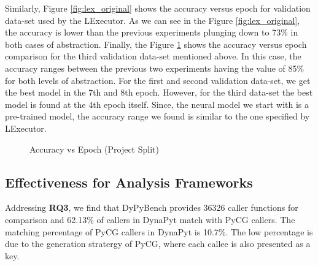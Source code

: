 Similarly, Figure \ref{fig:lex_original} shows the accuracy versus epoch for validation data-set used by the LExecutor.
As we can see in the Figure \ref{fig:lex_original}, the accuracy is lower than the previous experiments plunging down to 73\% in both cases of abstraction.
Finally, the Figure \ref{fig:lex_project} shows the accuracy versus epoch comparison for the third validation data-set mentioned above.
In this case, the accuracy ranges between the previous two experiments having the value of 85\% for both levels of abstraction.
For the first and second validation data-set, we get the best model in the 7th and 8th epoch.
However, for the third data-set the best model is found at the 4th epoch itself.
Since, the neural model we start with is a pre-trained model, the accuracy range we found is similar to the one specified by LExecutor.

\begin{figure}[ht]
    \centering
    \caption[Accuracy vs Epoch (Project Split)]{\label{fig:lex_project}Accuracy vs Epoch (Project Split) }
\end{figure}


\subsection{Effectiveness for Analysis Frameworks}
Addressing \textbf{RQ3}, we find that DyPyBench provides 36326 caller functions for comparison and 62.13\% of callers in DynaPyt match with PyCG callers.
The matching percentage of PyCG callers in DynaPyt is 10.7\%.
The low percentage is due to the generation stratergy of PyCG, where each callee is also presented as a key.
